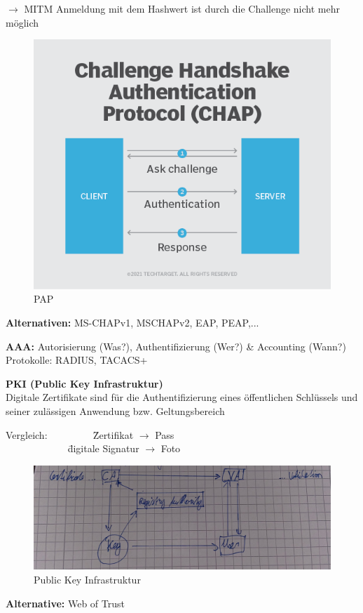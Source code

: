 \begin{enumerate}
\begin{itemize}
		$\rightarrow$ MITM Anmeldung mit dem Hashwert ist durch die Challenge nicht mehr möglich
		\begin{figure}[H]
			\centering
			\includegraphics[width=0.6\linewidth]{figures/chap.png}
			\caption{PAP}
		\end{figure}
		\textbf{Alternativen:} MS-CHAPv1, MSCHAPv2, EAP, PEAP,...
	\end{itemize}
\end{enumerate}

\textbf{AAA:} Autorisierung (Was?), Authentifizierung (Wer?) \& Accounting (Wann?) \\
Protokolle: RADIUS, TACACS+

\textbf{PKI (Public Key Infrastruktur)} \\
Digitale Zertifikate sind für die Authentifizierung eines öffentlichen Schlüssels und seiner zulässigen Anwendung bzw. Geltungsbereich 

\begin{tabbing}
	Vergleich: ~~~~~~~~ \= Zertifikat $\rightarrow$ Pass \\
	~~~~~~~~~~~~ \= digitale Signatur $\rightarrow$ Foto
\end{tabbing}

\begin{figure}[H]
	\centering
	\includegraphics[width=0.7\linewidth]{figures/cert.jpeg}
	\caption{Public Key Infrastruktur}
\end{figure}

\textbf{Alternative:} Web of Trust

